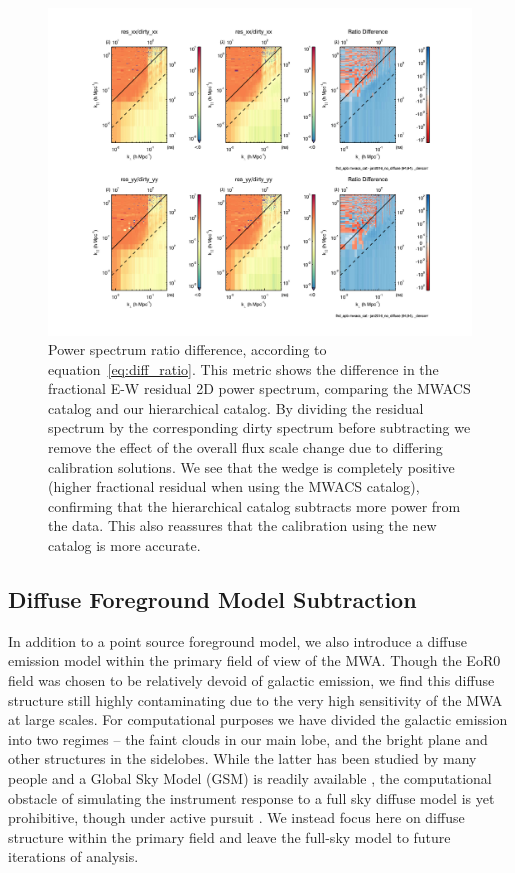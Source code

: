 \documentclass[iop]{emulateapj}
\begin{document}
\begin{figure}
\includegraphics[width=\columnwidth]{mwacs_ratio.pdf}
\caption{Power spectrum ratio difference, according to equation~\ref{eq:diff_ratio}. This 
metric shows the difference in the fractional E-W residual 2D power spectrum, comparing 
the MWACS catalog and our hierarchical catalog. By dividing the residual spectrum by the 
corresponding dirty spectrum before subtracting we remove the effect of the overall flux 
scale change due to differing calibration solutions. We see that the wedge is completely 
positive (higher fractional residual when using the MWACS catalog), confirming that the 
hierarchical catalog subtracts more power from the data. This also reassures that the 
calibration using the new catalog is more accurate. 
\label{fig:mwacs_ratio}
}
\end{figure}

\subsection{Diffuse Foreground Model Subtraction}

In addition to a point source foreground model, we also introduce a diffuse emission model 
within the primary field of view of the MWA. Though the EoR0 field was chosen to be 
relatively devoid of galactic emission, we find this diffuse structure still highly contaminating 
due to the very high sensitivity of the MWA at large scales. For computational purposes we 
have divided the galactic emission into two regimes -- the faint clouds in our main lobe, and 
the bright plane and other structures in the sidelobes. While the latter has been studied by 
many people and a Global Sky Model (GSM) is readily available 
\citep{deOliveira-Costa:2008}, the computational obstacle of simulating the instrument 
response to a full sky diffuse model is yet prohibitive, though under active pursuit 
\citep{Thyagarajan:2015}. We instead focus here on diffuse structure within the primary field 
and leave the full-sky model to future iterations of analysis.
\end{document}
